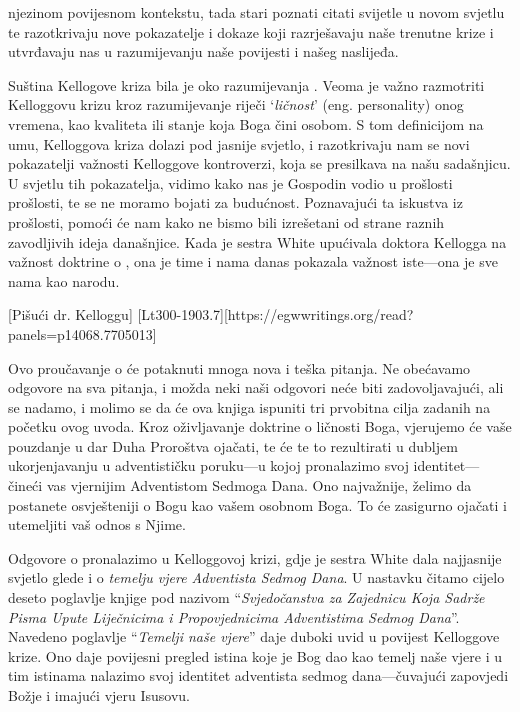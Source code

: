 njezinom povijesnom kontekstu, tada stari poznati citati svijetle u novom svjetlu te razotkrivaju nove pokazatelje i dokaze koji razrješavaju naše trenutne krize i utvrđavaju nas u razumijevanju naše povijesti i našeg naslijeđa.

Suština Kellogove kriza bila je oko razumijevanja . Veoma je važno razmotriti Kelloggovu krizu kroz razumijevanje riječi ‘\textit{ličnost}’ (eng. personality) onog vremena, kao kvaliteta ili stanje koja Boga čini osobom. S tom definicijom na umu, Kelloggova kriza dolazi pod jasnije svjetlo, i razotkrivaju nam se novi pokazatelji važnosti Kelloggove kontroverzi, koja se presilkava na našu sadašnjicu. U svjetlu tih pokazatelja, vidimo kako nas je Gospodin vodio u prošlosti prošlosti, te se ne moramo bojati za budućnost. Poznavajući ta iskustva iz prošlosti, pomoći će nam kako ne bismo bili izrešetani od strane raznih zavodljivih ideja današnjice. Kada je sestra White upućivala doktora Kellogga na važnost doktrine o , ona je time i nama danas pokazala važnost iste—ona je sve nama kao narodu.

[Pišući dr. Kelloggu] [Lt300-1903.7][https://egwwritings.org/read?panels=p14068.7705013]

Ovo proučavanje o  će potaknuti mnoga nova i teška pitanja. Ne obećavamo odgovore na sva pitanja, i možda neki naši odgovori neće biti zadovoljavajući, ali se nadamo, i molimo se da će ova knjiga ispuniti tri prvobitna cilja zadanih na početku ovog uvoda. Kroz oživljavanje doktrine o ličnosti Boga, vjerujemo će vaše pouzdanje u dar Duha Proroštva ojačati, te će te to rezultirati u dubljem ukorjenjavanju u adventističku poruku—u kojoj pronalazimo svoj identitet—čineći vas vjernijim Adventistom Sedmoga Dana. Ono najvažnije, želimo da postanete osvješteniji o Bogu kao vašem osobnom Boga. To će zasigurno ojačati i utemeljiti vaš odnos s Njime.

Odgovore o  pronalazimo u Kelloggovoj krizi, gdje je sestra White dala najjasnije svjetlo glede  i o \textit{temelju vjere Adventista Sedmog Dana}. U nastavku čitamo cijelo deseto poglavlje knjige pod nazivom “\textit{Svjedočanstva za Zajednicu Koja Sadrže Pisma Upute Liječnicima i Propovjednicima Adventistima Sedmog Dana}”. Navedeno poglavlje “\textit{Temelji naše vjere}” daje duboki uvid u povijest Kelloggove krize. Ono daje povijesni pregled istina koje je Bog dao kao temelj naše vjere i u tim istinama nalazimo svoj identitet adventista sedmog dana—čuvajući zapovjedi Božje i imajući vjeru Isusovu.
